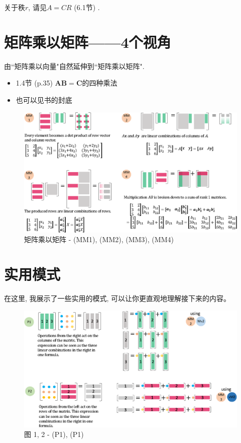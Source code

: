 \documentclass[letterpaper]{article}
\begin{document}
关于秩$r$, 请见$A=CR$ (6.1节) .


\section{矩阵乘以矩阵——4个视角}

由``矩阵乘以向量"自然延伸到``矩阵乘以矩阵".

\begin{itemize}
  \item 1.4节 (p.35) $\bm{AB=C}$的四种乘法
  \item 也可以见书的封底
\end{itemize} 


\begin{figure}[H]
  \centering
  \includegraphics[scale=0.8]{MatrixTimesMatrix.eps}
  \caption{矩阵乘以矩阵 - (MM1), (MM2), (MM3), (MM4)}
\end{figure}

\section{实用模式}

在这里, 我展示了一些实用的模式, 可以让你更直观地理解接下来的内容。

\begin{figure}[H]
  \centering
  \includegraphics[scale=0.8]{Pattern12.eps}
  \caption{图 1, 2 - (P1), (P1)}
\end{figure}
\end{document}

